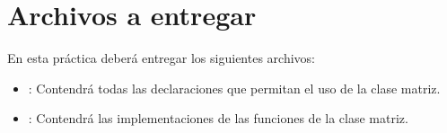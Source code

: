 \section{Archivos a entregar}

En esta práctica deberá entregar los siguientes archivos:

\begin{itemize}
\item {}: Contendrá todas las declaraciones que permitan el uso de la clase matriz.
\item {}: Contendrá las implementaciones de las funciones de la clase matriz.
\end{itemize}
